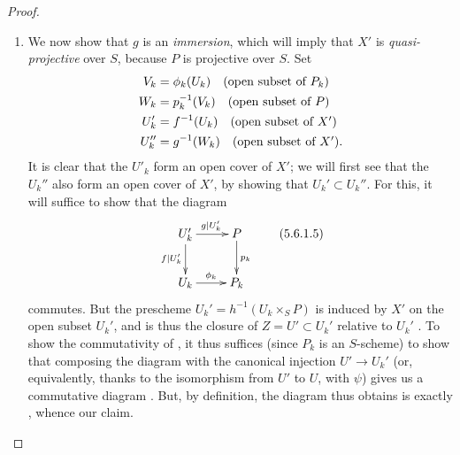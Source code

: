 \begin{proof}
\begin{enumerate}[label=(\Alph*)]
  \item We now show that $g$ is an \emph{immersion}, which will imply that $X'$ is \emph{quasi-projective} over $S$, because $P$ is projective over $S$.
    Set
    \begin{align*}
      V_k&=\phi_k(U_k)  \quad\mbox{(open subset of $P_k$)}\\
      W_k&=p_k^{-1}(V_k) \quad\mbox{(open subset of $P$)}\\
      U_k'&=f^{-1}(U_k)  \quad\mbox{(open subset of $X'$)}\\
      U_k''&=g^{-1}(W_k) \quad\mbox{(open subset of $X'$)}.
    \end{align*}
    It is clear that the $U'_k$ form an open cover of $X'$; we will first see that the $U_k''$ also form an open cover of $X'$, by showing that $U_k'\subset U_k''$.
    For this, it will suffice to show that the diagram
    \[
    \label{2.5.6.1.5}
      \xymatrix{
        U_k'\ar[r]^{g|U_k'}\ar[d]_{f|U_k'} &
        P\ar[d]^{p_k}\\
        U_k\ar[r]^{\vphi_k} &
        P_k
      }
      \tag{5.6.1.5}
    \]
    commutes.
    But the prescheme $U_k'=h^{-1}(U_k\times_S P)$ is induced by $X'$ on the open subset $U_k'$, and is thus the closure of $Z=U'\subset U_k'$ relative to $U_k'$ .
    To show the commutativity of , it thus suffices (since $P_k$ is an $S$-scheme) to show that composing the diagram with the canonical injection $U'\to U_k'$ (or, equivalently, thanks to the isomorphism from $U'$ to $U$, with $\psi$) gives us a commutative diagram .
    But, by definition, the diagram thus obtains is exactly , whence our claim.


\end{enumerate}
\end{proof}
